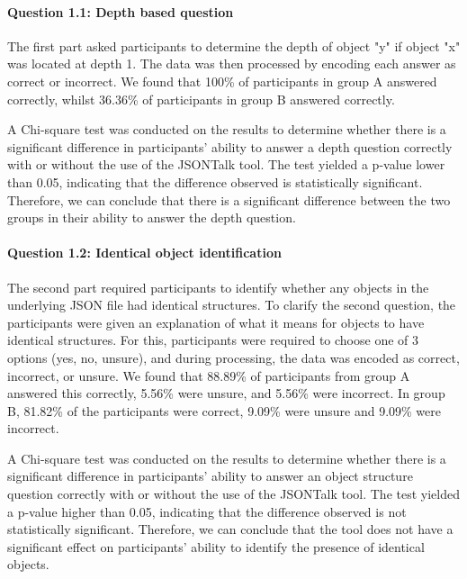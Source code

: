 \documentclass{l4proj}
\begin{document}
\paragraph{Question 1.1: Depth based question} \hfill

The first part asked participants to determine the depth of object "y" if object "x" was located at depth 1. The data was then processed by encoding each answer as correct or incorrect. We found that 100\% of participants in group A answered correctly, whilst 36.36\% of participants in group B answered correctly.

A Chi-square test was conducted on the results to determine whether there is a significant difference in participants' ability to answer a depth question correctly with or without the use of the JSONTalk tool. The test yielded a p-value lower than 0.05, indicating that the difference observed is statistically significant. Therefore, we can conclude that there is a significant difference between the two groups in their ability to answer the depth question.






\paragraph{Question 1.2: Identical object identification}\hfill

The second part required participants to identify whether any objects in the underlying JSON file had identical structures. To clarify the second question, the participants were given an explanation of what it means for objects to have identical structures. For this, participants were required to choose one of 3 options (yes, no, unsure), and during processing, the data was encoded as correct, incorrect, or unsure. We found that 88.89\% of participants from group A answered this correctly, 5.56\% were unsure, and 5.56\% were incorrect. 
In group B, 81.82\% of the participants were correct, 9.09\% were unsure and 9.09\% were incorrect. 

A Chi-square test was conducted on the results to determine whether there is a significant difference in participants' ability to answer an object structure question correctly with or without the use of the JSONTalk tool. The test yielded a p-value higher than 0.05, indicating that the difference observed is not statistically significant. Therefore, we can conclude that the tool does not have a significant effect on participants' ability to identify the presence of identical objects.
\end{document}
